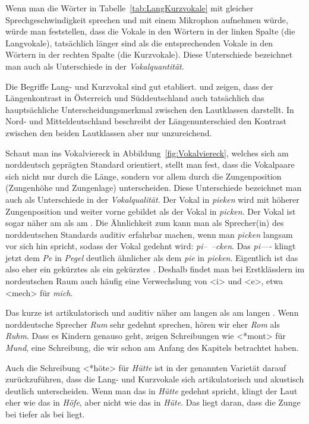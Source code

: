 Wenn man die Wörter in Tabelle~\ref{tab:LangKurzvokale} mit gleicher Sprechgeschwindigkeit sprechen und mit einem Mikrophon aufnehmen würde, würde man feststellen, dass die Vokale in den Wörtern in der linken Spalte (die Langvokale), tatsächlich länger sind als die entsprechenden Vokale in den Wörtern in der rechten Spalte (die Kurzvokale). Diese Unterschiede bezeichnet man auch als Unterschiede in der \textit{Vokalquantität}.

Die Begriffe Lang- und Kurzvokal sind gut etabliert. \citet{Iivonen1987} und \citet{Spiekermann2002} zeigen, dass der Längenkontrast in Österreich und Süddeutschland auch tatsächlich das hauptsächliche Unterscheidungsmerkmal zwischen den Lautklassen darstellt. In Nord- und Mitteldeutschland beschreibt der Längenunterschied den Kontrast zwischen den beiden Lautklassen aber nur unzureichend. 

Schaut man ins Vokalviereck in Abbildung~\ref{fig:Vokalviereck}, welches sich am norddeutsch geprägten Standard orientiert, stellt man fest, dass die Vokalpaare sich nicht nur durch die Länge, sondern vor allem durch die Zungenposition (Zungenhöhe und Zungenlage) unterscheiden. Diese Unterschiede bezeichnet man auch als Unterschiede in der \textit{Vokalqualität}. Der Vokal \textipa{[i]} in \textit{pieken} wird mit höherer Zungenposition und weiter vorne gebildet als der Vokal \textipa{[I]} in \textit{picken}. Der Vokal \textipa{[I]} ist sogar näher am \textipa{[e]} als am \textipa{[i]}. Die Ähnlichkeit zum \textipa{[e]} kann man als Sprecher(in) des norddeutschen Standards auditiv erfahrbar machen, wenn man \textit{picken} langsam vor sich hin spricht, sodass der Vokal gedehnt wird: \mbox{\textit{pi-- --cken}}. Das \textit{pi----} klingt jetzt dem \textit{Pe} in \textit{Pegel} deutlich ähnlicher als dem \textit{pie} in \textit{pieken}. Eigentlich ist das \textipa{[I]} also eher ein gekürztes \textipa{[e]} als ein gekürztes \textipa{[i]}. Deshalb findet man bei Erstklässlern im nordeutschen Raum auch häufig eine Verwechslung von <i> und <e>, etwa <mech> für \textit{mich}.

Das kurze \textipa{[U]} ist artikulatorisch und auditiv näher am langen \textipa{[o:]} als am langen \textipa{[u:]}. Wenn norddeutsche Sprecher \textit{Rum} sehr gedehnt sprechen, hören wir eher \textit{Rom} als \textit{Ruhm}. Dass es Kindern genauso geht, zeigen Schreibungen wie <*mont> für \textit{Mund}, eine Schreibung, die wir schon am Anfang des Kapitels betrachtet haben.

Auch die Schreibung <*höte> für \textit{Hütte} ist in der genannten Varietät darauf zurückzuführen, dass die Lang- und Kurzvokale sich artikulatorisch und akustisch deutlich unterscheiden. Wenn man das \textipa{[Y]} in \textit{Hütte} gedehnt spricht, klingt der Laut eher wie das \textipa{[\o :]} in \textit{Höfe}, aber nicht wie das \textipa{[y:]} in \textit{Hüte}. Das liegt daran, dass die Zunge bei \textipa{[Y]} tiefer als bei \textipa{[y]} liegt.

